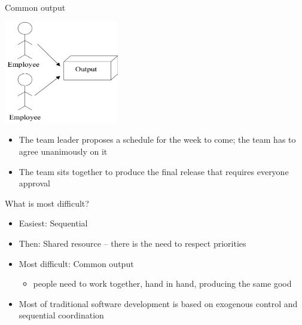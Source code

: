 \documentclass{beamer}
\begin{document}
\begin{frame}{\centerline{Common output}}
\begin{center}
\includegraphics[width=50mm]{A2022.IDSEPC.ProcessoDiProduzione/img-img13.png}
\end{center}

\begin{itemize}
\item  The team leader proposes a schedule for the week to come; the team has to agree unanimously on it

\item  The team sits together to produce the final release that requires everyone approval
  
\end{itemize}


\end{frame}

\begin{frame}{\centerline{What is most difficult?}}
\begin{itemize}

\item  Easiest: Sequential
\item  Then: Shared resource -- there is the need to respect priorities
\item  Most difficult: Common output
\begin{itemize}

\item  people need to work together, hand in hand, producing the same good
\end{itemize}

\item Most of traditional software development is based on exogenous control and sequential coordination 

\end{itemize}

\end{frame}
\end{document}
